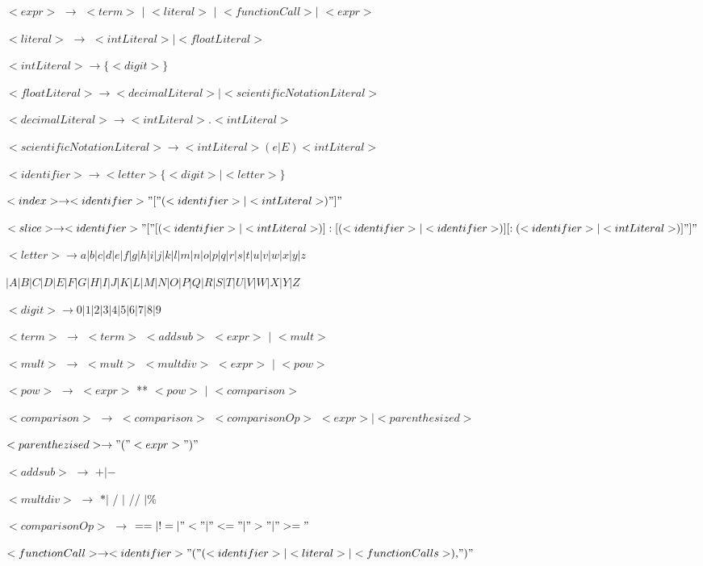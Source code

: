 $<expr>$ $\rightarrow$ $<term>$ $|$ $<literal>$ $|$ $<functionCall> |$ $<expr>$ 

$<literal>$ $\rightarrow$ $<intLiteral> | <floatLiteral>$ 

$<intLiteral> \rightarrow \{<digit>\}$

$<floatLiteral> \rightarrow <decimalLiteral> | <scientificNotationLiteral>$

$<decimalLiteral> \rightarrow <intLiteral>.<intLiteral>$

$<scientificNotationLiteral> \rightarrow <intLiteral> (e|E) <intLiteral>$

$<identifier> \rightarrow <letter> \{<digit>|<letter>\}$

$<index> \rightarrow <identifier>"["(<identifier> | <intLiteral>)"]"$

$<slice> \rightarrow <identifier>"["[(<identifier> | <intLiteral>)]:[(<identifier> | <identifier>)][:(<identifier> | <intLiteral>)]"]"$

$<letter> \rightarrow a | b | c | d | e | f | g | h | i | j | k | l | m | n | o | p | q | r | s | t | u | v | w | x | y | z $

$| A | B | C | D | E | F | G | H | I | J | K | L | M | N | O | P | Q | R |  S | T | U | V | W | X | Y | Z$

$<digit> \rightarrow 0 | 1 | 2 | 3 | 4 | 5 | 6 | 7 | 8 | 9$

$<term>$ $\rightarrow$ $<term>$ $<addsub>$ $<expr>$ $|$ $<mult>$

$<mult>$ $\rightarrow$ $<mult>$ $<multdiv>$ $<expr>$ $|$ $<pow>$

$<pow>$ $\rightarrow$ $<expr>$ ** $<pow>$ $|$ $<comparison>$

$<comparison>$ $\rightarrow$ $<comparison>$ $<comparisonOp>$ $<expr> | <parenthesized>$

$<parenthezised> \rightarrow "("<expr>")"$

$<addsub>$ $\rightarrow$ $+ | -$

$<multdiv>$ $\rightarrow$ $* | $ / $ | $ // $ | \%$

$<comparisonOp>$ $\rightarrow$ $== | != | "<" | "<=" | ">" | ">="$

$<functionCall> \rightarrow <identifier>"("{(<identifier>|<literal>|<functionCalls>),}")"$